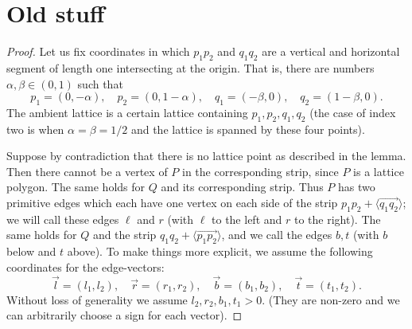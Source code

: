\documentclass{amsart}
\theoremstyle{plain}
\theoremstyle{definition}
\begin{document}
\appendix

\section{Old stuff}


\begin{proof}

Let us fix coordinates in which $p_1p_2$ and $q_1q_2$ are a vertical and horizontal segment of length one intersecting at the origin. That is, there are numbers $\alpha, \beta \in (0,1)$ such that
\[
p_1=(0,-\alpha), \quad
p_2=(0,1-\alpha), \quad
q_1=(-\beta,0), \quad
q_2=(1-\beta,0).
\] 
The ambient lattice is a certain lattice containing $p_1,p_2,q_1,q_2$ (the case of index two is when $\alpha=\beta=1/2$ and the lattice is spanned by these four points).

Suppose by contradiction that there is no lattice point as described in the lemma. Then there cannot be a vertex of $P$ in the corresponding strip, since $P$ is a lattice polygon. The same holds for $Q$ and its corresponding strip. Thus $P$ has two primitive edges which each have one vertex on each side of the strip $p_1p_2 + \langle \overrightarrow{q_1q_2}\rangle$; we will call these edges $\ell$ and $r$ (with $\ell$ to the left and $r$ to the right). The same holds for $Q$ and the strip $q_1q_2 + \langle \overrightarrow{p_1p_2}\rangle$, and we call the edges  $b, t$ (with $b$ below and $t$ above). To make things more explicit, we assume the following coordinates for the edge-vectors:
\[
\vec l = (l_1,l_2), \quad
\vec r= (r_1,r_2), \quad
\vec b= (b_1,b_2), \quad
\vec t= (t_1,t_2).
\]
Without loss of generality we assume $l_2,r_2,b_1,t_1 >0$. (They are non-zero and we can arbitrarily choose a sign for each vector).







\end{proof}
\end{document}
